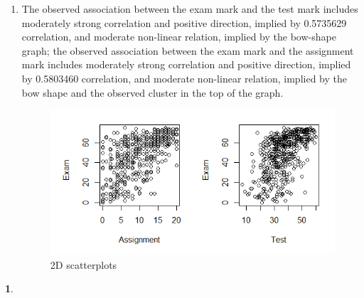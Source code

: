 \documentclass[10pt]{article}
\newtheorem{prob}{\bm{$Problem$}}
\begin{document}
\begin{enumerate}[1)]
\item
The observed association between the exam mark and the test mark includes moderately strong correlation and positive direction, implied by 0.5735629 correlation, and moderate non-linear relation, implied by the bow-shape graph; the observed association between the exam mark and the assignment mark includes moderately strong correlation and positive direction, implied by 0.5803460 correlation, and moderate non-linear relation, implied by the bow shape and the observed cluster in the top of the graph.
\begin{figure}[H]
  \centering
  \includegraphics[scale=0.45]{p14a.png}
  \caption{2D scatterplots}
\end{figure}

\end{enumerate}
\vspace{3mm}

\newpage

\begin{prob}
\end{prob}
\vspace{3mm}
\end{document}
